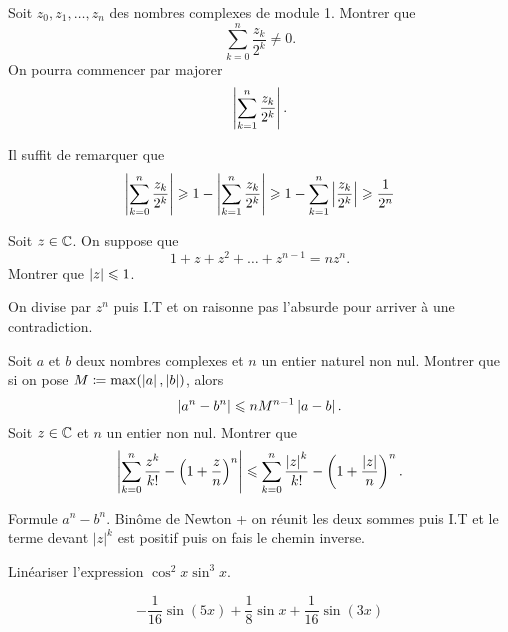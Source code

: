 \documentclass{magnolia}
\begin{document}
Soit $z_0,z_1,\ldots,z_n$ des nombres complexes de module 1. Montrer que
  \[\sum_{k=0}^n \frac{z_k}{2^k}\neq 0.\]
On pourra commencer par majorer
\[\left|\sum_{k=1}^n \frac{z_k}{2^k}\right|.\]
\begin{sol}
Il suffit de remarquer que
\[\left|\sum_{k=0}^n \frac{z_k}{2^k}\right|\geqslant
  1-\left|\sum_{k=1}^n \frac{z_k}{2^k}\right|\geqslant 1-\sum_{k=1}^n \left|\frac{z_k}{2^k}\right| \geqslant \frac{1}{2^n}\]
\end{sol}

Soit $z\in\mathbb{C}$. On suppose que
\[1+z+z^2+\dots+z^{n-1}=nz^n.\]
Montrer que $\left|z\right|\leqslant 1$.
\begin{sol}
On divise par $z^n$ puis I.T et on raisonne pas l'absurde pour arriver à une contradiction.
\end{sol}


\begin{questions}
\question Soit $a$ et $b$ deux nombres complexes et $n$ un entier naturel
  non nul. Montrer que si on pose $M\coloneqq\max(\left|a\right|,\left|b\right|)$, alors
  $$\left|a^n-b^n\right|\leqslant nM^{n-1}\left|a-b\right|.$$
\question Soit $z\in\mathbb{C}$ et $n$ un entier non nul. Montrer que
  $$\left|\sum_{k=0}^n \frac{z^k}{k!} - \left(1+\frac{z}{n}\right)^n\right|\leqslant
    \sum_{k=0}^n \frac{\left|z\right|^k}{k!}-\left(1+\frac{\left|z\right|}{n}\right)^n.$$
\end{questions}

\begin{sol}
\begin{questions}
\question Formule $a^n-b^n$.
\question Binôme de Newton + on réunit les deux sommes puis I.T et le terme devant $|z|^k$ est positif puis on fais le chemin inverse.
\end{questions}
\end{sol}



Linéariser l'expression $\cos^2 x \sin^3 x$.
\begin{sol}
\[-\frac{1}{16}\sin(5x)+\frac{1}{8}\sin x+\frac{1}{16}\sin(3x)\]
\end{sol}
\end{document}
